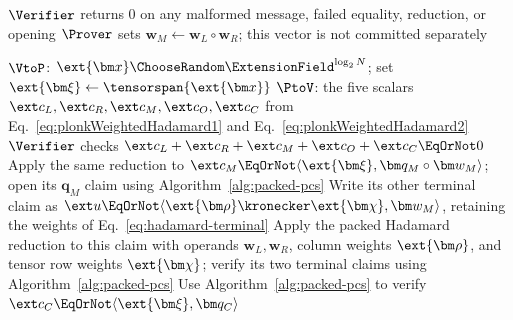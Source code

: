 \begin{algorithm}[!t]
\footnotesize
\caption{PLONK proof with single-instance packing}
\label{alg:single-instance-packing}

\(\Verifier\) returns \(0\) on any malformed message,
failed equality, reduction, or opening\;
\(\Prover\) sets \(\bm w_M\leftarrow\bm w_L\circ\bm w_R\);
this vector is not committed separately\;

\(\VtoP\): \(\ext{\bm x}\ChooseRandom
\ExtensionField^{\log_2N}\);
set \(\ext{\bm\xi}\leftarrow\tensorspan{\ext{\bm x}}\)\;
\(\PtoV\): the five scalars
\(\ext c_L,\ext c_R,\ext c_M,\ext c_O,\ext c_C\)
from Eq.~\eqref{eq:plonkWeightedHadamard1} and
Eq.~\eqref{eq:plonkWeightedHadamard2}\;
\(\Verifier\) checks
\(\ext c_L+\ext c_R+\ext c_M+\ext c_O+\ext c_C\EqOrNot0\)\;
Apply the same reduction to
\(\ext c_M\EqOrNot
  \langle\ext{\bm\xi},\bm q_M\circ\bm w_M\rangle\);
open its \(\bm q_M\) claim using Algorithm~\ref{alg:packed-pcs}\;
Write its other terminal claim as
\(\ext u\EqOrNot
  \langle\ext{\bm\rho}\kronecker\ext{\bm\chi},\bm w_M\rangle\),
retaining the weights of Eq.~\eqref{eq:hadamard-terminal}\;
Apply the packed Hadamard reduction to this claim with
operands \(\bm w_L,\bm w_R\), column weights \(\ext{\bm\rho}\),
and tensor row weights \(\ext{\bm\chi}\);
verify its two terminal claims using Algorithm~\ref{alg:packed-pcs}\;
Use Algorithm~\ref{alg:packed-pcs} to verify
\(\ext c_C\EqOrNot\langle\ext{\bm\xi},\bm q_C\rangle\)\;


\end{algorithm}
